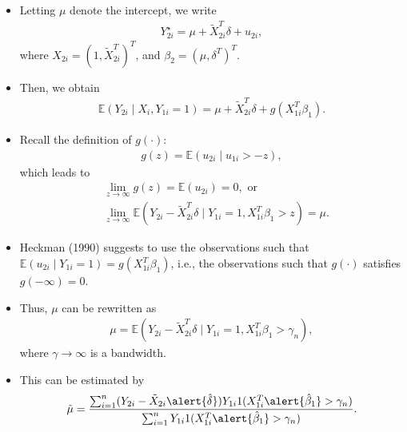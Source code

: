 \documentclass[xcolor=svgnames,dvipdfmx,cjk]{beamer}
\theoremstyle{example}
\def\E{\mathbb{E}}
\begin{document}
\begin{frame}
      \begin{itemize}
            \item Letting $\mu$ denote the intercept,
                  we write 
                  \begin{align*}
                        Y_{2i}^{\star} = \mu + \tilde{X}_{2i}^T \delta + u_{2i},
                  \end{align*}
                  where $X_{2i} = (1, \tilde{X}_{2i}^T)^T$, and $\beta_2 = (\mu, \delta^T)^T$.
            \item Then, we obtain 
                  \begin{align*}
                        \E(Y_{2i} \mid X_i, Y_{1i}=1) = \mu + \tilde{X}_{2i}^T \delta + g(X_{1i}^T\beta_1).
                  \end{align*}
            \item Recall the definition of $g(\cdot)$:
                  \begin{align*}
                        g(z) = \E(u_{2i} \mid u_{1i} > -z),
                  \end{align*}
                  which leads to 
                  \begin{align*}
                        &\lim_{z \to \infty} g(z) = \E(u_{2i}) = 0, \text{ or}\\
                        &\lim_{z \to \infty} \E(Y_{2i} - \tilde{X}_{2i}^T \delta \mid Y_{1i} = 1, X_{1i}^T \beta_1 > z) = \mu.
                  \end{align*}
      \end{itemize}
\end{frame}

\begin{frame}
      \begin{itemize}
            \item Heckman (1990) suggests to use the observations such that 
                  $\E(u_{2i} \mid Y_{1i} =1) = g(X_{1i}^T \beta_1)$, i.e., 
                  the observations such that $g(\cdot)$ satisfies $g(-\infty) = 0$.
            \item Thus, $\mu$ can be rewritten as
                  \begin{align*}
                        \mu = \E(Y_{2i} - \tilde{X}_{2i}^T \delta \mid Y_{1i}=1, X_{1i}^T\beta_1 > \gamma_n),
                  \end{align*}
                  where $\gamma \to \infty$ is a bandwidth.
            \item This can be estimated by 
                  \begin{align*}
                        \tilde{\mu} = \frac{
                              \sum_{i=1}^n (Y_{2i} - \tilde{X}_{2i}\alert{\hat{\delta}}) Y_{1i} 1(X_{1i}^T \alert{\hat{\beta}_1} > \gamma_n)
                        }{
                              \sum_{i=1}^n  Y_{1i} 1(X_{1i}^T \alert{\hat{\beta}_1} > \gamma_n)
                        }.
                  \end{align*}
      \end{itemize}
\end{frame}
\end{document}
